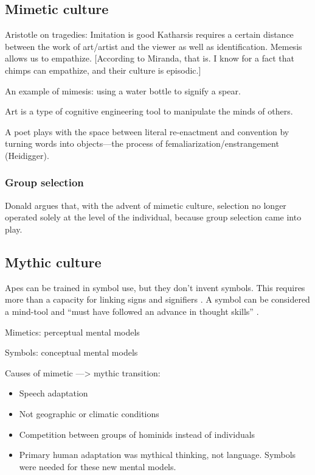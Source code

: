 \documentclass{article}
\begin{document}
\subsection{Mimetic culture}

Aristotle on tragedies: Imitation is good
Katharsis requires a certain distance between the work of art/artist and the viewer as well as identification. Memesis allows us to empathize. [According to Miranda, that is. I know for a fact that chimps can empathize, and their culture is episodic.]

An example of mimesis: using a water bottle to signify a spear.

Art is a type of cognitive engineering tool to manipulate the minds of others.

A poet plays with the space between literal re-enactment and convention by turning words into objects---the process of femaliarization/enstrangement (Heidigger).

\subsubsection{Group selection}

Donald argues that, with the advent of mimetic culture, selection no longer operated solely at the level of the individual, because group selection came into play.

\subsection{Mythic culture}

Apes can be trained in symbol use, but they don't invent symbols. This requires more than a capacity for linking signs and signifiers \citep[p.~217-220]{donald1991}. A symbol can be considered a mind-tool \citep{gregory1981} and ``must have followed an advance in thought skills'' \citep[p.219]{donald1991}.

Mimetics: perceptual mental models

Symbols: conceptual mental models

Causes of mimetic ---> mythic transition:
\begin{itemize}
  \item Speech adaptation
  \item Not geographic or climatic conditions
  \item Competition between groups of hominids instead of individuals %
  \item Primary human adaptation was mythical thinking, not language. Symbols were needed for these new mental models.
\end{itemize}
\end{document}
